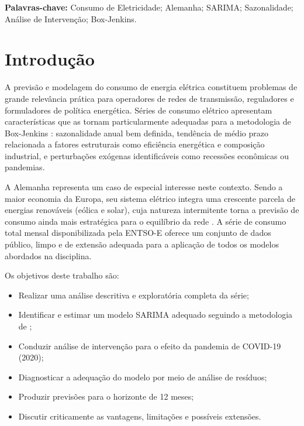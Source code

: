 \documentclass[12pt, a4paper]{article}
\begin{document}
\vspace{0.5cm}
\noindent\textbf{Palavras-chave:} Consumo de Eletricidade; Alemanha; SARIMA; Sazonalidade;
Análise de Intervenção; Box-Jenkins.

\vspace{0.5cm}
\tableofcontents
\newpage

\section{Introdução}

A previsão e modelagem do consumo de energia elétrica constituem problemas de grande
relevância prática para operadores de redes de transmissão, reguladores e formuladores
de política energética. Séries de consumo elétrico apresentam características que as
tornam particularmente adequadas para a metodologia de Box-Jenkins
\cite{SeriesTemporaisMoretti}: sazonalidade anual bem definida, tendência de médio prazo
relacionada a fatores estruturais como eficiência energética e composição industrial, e
perturbações exógenas identificáveis como recessões econômicas ou pandemias.

A Alemanha representa um caso de especial interesse neste contexto. Sendo a maior
economia da Europa, seu sistema elétrico integra uma crescente parcela de energias
renováveis (eólica e solar), cuja natureza intermitente torna a previsão de consumo
ainda mais estratégica para o equilíbrio da rede \cite{EntsoData}. A série de consumo
total mensal disponibilizada pela ENTSO-E oferece um conjunto de dados público,
limpo e de extensão adequada para a aplicação de todos os modelos abordados na
disciplina.

Os objetivos deste trabalho são:
\begin{itemize}
  \item Realizar uma análise descritiva e exploratória completa da série;
  \item Identificar e estimar um modelo SARIMA adequado seguindo a metodologia
    de \textcite{BoxTimeSeries};
  \item Conduzir análise de intervenção para o efeito da pandemia de COVID-19 (2020);
  \item Diagnosticar a adequação do modelo por meio de análise de resíduos;
  \item Produzir previsões para o horizonte de 12 meses;
  \item Discutir criticamente as vantagens, limitações e possíveis extensões.
\end{itemize}
\end{document}
